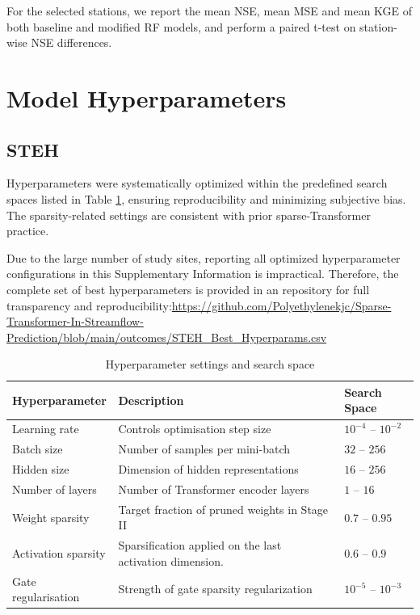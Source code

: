 \documentclass[11pt]{article}
\begin{document}
For the selected stations, we report the mean NSE, mean MSE and mean KGE of both baseline and modified RF models, and perform a paired t-test on station-wise NSE differences.

\section{Model Hyperparameters}
\subsection{STEH}
\label{sec:STEHhyper}

Hyperparameters were systematically optimized within the predefined search spaces listed in Table \ref{tab:hyperparameters}\cite{BO_OPT}, ensuring reproducibility and minimizing subjective bias. The sparsity-related settings are consistent with prior sparse-Transformer practice\cite{openai_weight_sparse_transformers}.

Due to the large number of study sites, reporting all optimized hyperparameter configurations in this Supplementary Information is impractical. Therefore, the complete set of best hyperparameters is provided in an repository for full transparency and reproducibility:\href{https://github.com/Polyethylenekjc/Sparse-Transformer-In-Streamflow-Prediction/blob/main/outcomes/STEH\_Best\_Hyperparams.csv}{https://github.com/Polyethylenekjc/Sparse-Transformer-In-Streamflow-Prediction/blob/main/outcomes/STEH\_Best\_Hyperparams.csv}


\begin{table}[htbp]
    \centering
    \caption{Hyperparameter settings and search space}
    \label{tab:hyperparameters}
    \begin{tabular*}{\textwidth}{@{\extracolsep{\fill}}lll}
        \toprule
        \textbf{Hyperparameter} & \textbf{Description} & \textbf{Search Space} \\
        \midrule
        Learning rate & Controls optimisation step size & $10^{-4}$ -- $10^{-2}$ \\
        Batch size & Number of samples per mini-batch & $32$ -- $256$ \\
        Hidden size & Dimension of hidden representations & $16$ -- $256$ \\
        Number of layers & Number of Transformer encoder layers & $1$ -- $16$ \\
        Weight sparsity & Target fraction of pruned weights in Stage II & $0.7$ -- $0.95$ \\
        Activation sparsity & Sparsification applied on the last activation dimension. & $0.6$ -- $0.9$ \\
        Gate regularisation & Strength of gate sparsity regularization & $10^{-5}$ -- $10^{-3}$ \\
        \bottomrule
    \end{tabular*}
\end{table}
\end{document}
